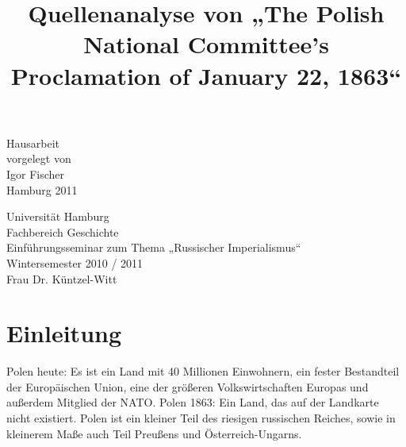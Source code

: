 \documentclass[12pt,headsepline,a4paper]{scrartcl}
\title{}
\author{}
\begin{document}
\begin{titlepage}
\date{}

\title{\Large Quellenanalyse von „The Polish National Committee's
Proclamation of January 22, 1863“}
{\let\newpage\relax\maketitle}

\begin{center}
\vfill
Hausarbeit\\
vorgelegt von\\
Igor Fischer \\
\null
Hamburg 2011
\vfill
\end{center}

\begin{minipage}{0.5\textwidth}
\begin{flushleft} 
Universität Hamburg\\
Fachbereich Geschichte\\
Einführungsseminar zum Thema „Russischer Imperialismus“\\
Wintersemester 2010 / 2011\\
Frau Dr. Küntzel-Witt\\

\end{flushleft}
\end{minipage}
\vline
\begin{minipage}{0.5\textwidth}
\end{minipage}

\end{titlepage}

\tableofcontents
\thispagestyle{empty}
\newpage


\section*{Einleitung}
Polen heute: Es ist ein Land mit 40 Millionen Einwohnern, ein fester Bestandteil der Europäischen
Union, eine der größeren Volkswirtschaften Europas und außerdem Mitglied der NATO.
Polen 1863: Ein Land, das auf der Landkarte nicht existiert. Polen ist ein kleiner Teil des riesigen
russischen Reiches, sowie in kleinerem Maße auch Teil Preußens und Österreich-Ungarns.
\end{document}
